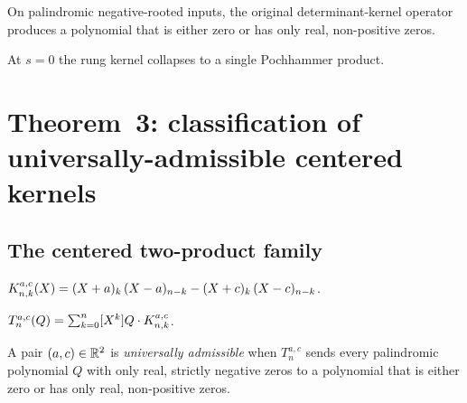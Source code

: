 \begin{corollary}
  \label{cor:original_kernel_palindromic}
  \leanok
  On palindromic negative-rooted inputs, the original determinant-kernel
  operator produces a polynomial that is either zero or has only real,
  non-positive zeros.
\end{corollary}

\begin{corollary}[Corollary~2 --- single-product kernel at $s=0$]
  \label{cor:single_product_kernel}
  \leanok
  At $s = 0$ the rung kernel collapses to a single Pochhammer product.
\end{corollary}

\chapter{Theorem~3: classification of universally-admissible centered kernels}
\label{ch:theorem3}

\section{The centered two-product family}

\begin{definition}
  \label{def:centeredKernel}
  \leanok
  $\Kcent{n}{k}{a}{c}(X)
    = \Poch{X+a}{k}\,\Poch{X-a}{n-k}
      - \Poch{X+c}{k}\,\Poch{X-c}{n-k}$.
\end{definition}

\begin{definition}
  \label{def:centeredOperator}
  \leanok
  $T^{a,c}_n(Q) = \sum_{k=0}^{n} [X^k] Q \cdot \Kcent{n}{k}{a}{c}$.
\end{definition}

\begin{definition}
  \label{def:UniversallyAdmissibleCentered}
  \leanok
  A pair $(a, c) \in \RR^2$ is \emph{universally admissible} when
  $T^{a,c}_n$ sends every palindromic polynomial $Q$ with only real,
  strictly negative zeros to a polynomial that is either zero or has only
  real, non-positive zeros.
\end{definition}

